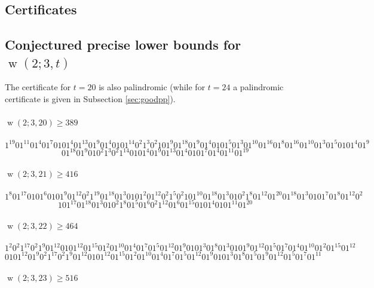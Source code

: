 \documentclass[final,3p,times]{elsarticle}
\theoremstyle{definition}
\DeclareMathOperator{\vdw}{w}
\begin{document}
\begin{appendix}

\section{Certificates}
\label{sec:Certificates}


\subsection{Conjectured precise lower bounds for $\vdw(2;3,t)$}
\label{sec:Certificates3tp}

The certificate for $t=20$ is also palindromic (while for $t=24$ a palindromic certificate is given in Subsection \ref{sec:goodpp}).

\paragraph{$\vdw(2; 3, 20)\geq 389$}

$$1^{19}01^{11}01^{4}01^{7}0101^{4}01^{13}01^{9}01^{4}0101^{14}0^{2}1^{3}0^{2}101^{9}01^{18}01^{9}01^{4}0101^{5}01^{3}01^{10}01^{16}01^{8}01^{16}01^{10}01^{3}01^{5}0101^{4}01^{9}$$
$$01^{18}01^{9}010^{2}1^{3}0^{2}1^{14}0101^{4}01^{9}01^{13}01^{4}0101^{7}01^{4}01^{11}01^{19}$$

\paragraph{$\vdw(2; 3, 21)\geq 416$}

$$1^{8}01^{17}0101^{6}0101^{9}01^{12}0^{2}1^{19}01^{18}01^{3}0101^{2}01^{12}0^{2}1^{5}0^{2}101^{10}01^{18}01^{3}010^{2}1^{8}01^{12}01^{20}01^{18}01^{3}0101^{7}01^{8}01^{12}0^{2}$$
$$101^{17}01^{18}01^{3}010^{2}1^{8}01^{5}01^{6}0^{2}1^{12}01^{6}01^{15}0101^{4}0101^{11}01^{20}$$

\paragraph{$\vdw(2; 3, 22)\geq 464$}

$$1^{2}0^{2}1^{17}0^{2}1^{9}01^{12}0101^{12}01^{15}01^{2}01^{10}01^{4}01^{7}01^{5}01^{12}01^{9}010
1^{3}01^{8}01^{3}0101^{9}01^{12}01^{5}01^{7}01^{4}01^{10}01^{2}01^{15}01^{12}$$
$$0101^{12}01^{9}0^{2}1^{17}0^{2}1^{9}01^{12}0101^{12}01^{15}01^{2}01^{10}01^{4}01^{7}01^{5}0
1^{12}01^{9}0101^{3}01^{8}01^{5}01^{9}01^{12}01^{5}01^{7}01^{11}$$

\paragraph{$\vdw(2; 3, 23)\geq 516$}


\end{appendix}
\end{document}

